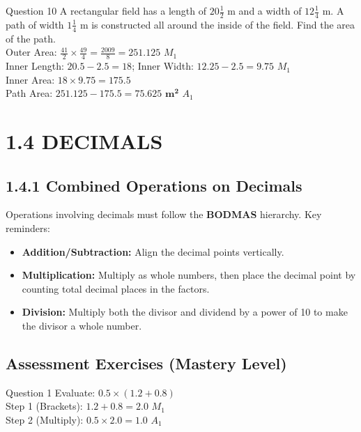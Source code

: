 \documentclass[12pt, a4paper, oneside]{article}
\begin{document}
\begin{solvingbox}{Question 10}
A rectangular field has a length of $20\frac{1}{2}$ m and a width of $12\frac{1}{4}$ m. A path of width $1\frac{1}{4}$ m is constructed all around the inside of the field. Find the area of the path. \\
Outer Area: $\frac{41}{2} \times \frac{49}{4} = \frac{2009}{8} = 251.125$ \hfill $M_1$ \\
Inner Length: $20.5 - 2.5 = 18$; Inner Width: $12.25 - 2.5 = 9.75$ \hfill $M_1$ \\
Inner Area: $18 \times 9.75 = 175.5$ \\
Path Area: $251.125 - 175.5 = \mathbf{75.625\text{ m}^2}$ \hfill $A_1$
\end{solvingbox}
\section*{1.4 DECIMALS}

\subsection*{1.4.1 Combined Operations on Decimals}

\begin{tcolorbox}[colback=lightgrey, colframe=primaryblue, title=\textbf{Concept Summary}, arc=5pt]
    Operations involving decimals must follow the \textbf{BODMAS} hierarchy. Key reminders:
    \begin{itemize}
        \item \textbf{Addition/Subtraction:} Align the decimal points vertically.
        \item \textbf{Multiplication:} Multiply as whole numbers, then place the decimal point by counting total decimal places in the factors.
        \item \textbf{Division:} Multiply both the divisor and dividend by a power of 10 to make the divisor a whole number.
    \end{itemize}
\end{tcolorbox}

\subsection*{Assessment Exercises (Mastery Level)}

\begin{solvingbox}{Question 1}
Evaluate: $0.5 \times (1.2 + 0.8)$ \\
Step 1 (Brackets): $1.2 + 0.8 = 2.0$ \hfill $M_1$ \\
Step 2 (Multiply): $0.5 \times 2.0 = \mathbf{1.0}$ \hfill $A_1$
\end{solvingbox}
\end{document}
